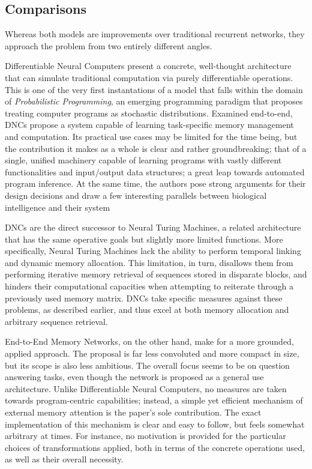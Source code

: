 \documentclass[]{article}
\begin{document}
\subsection{Comparisons}
Whereas both models are improvements over traditional recurrent networks, they approach the problem from two entirely different angles. 

Differentiable Neural Computers present a concrete, well-thought architecture that can simulate traditional computation via purely differentiable operations. This is one of the very first instantations of a model that falls within the domain of \textit{Probabilistic Programming}\cite{Meijer}, an emerging programming paradigm that proposes treating computer programs as stochastic distributions. Examined end-to-end, DNCs propose a system capable of learning task-specific memory management and computation. Its practical use cases may be limited for the time being, but the contribution it makes as a whole is clear and rather groundbreaking; that of a single, unified machinery capable of learning programs with vastly different functionalities and input/output data structures; a great leap towards automated program inference. At the same time, the authors pose strong arguments for their design decisions and draw a few interesting parallels between biological intelligence and their system

DNCs are the direct successor to Neural Turing Machines\cite{DBLP:journals/corr/GravesWD14}, a related architecture that has the same operative goals but slightly more limited functions. More specifically, Neural Turing Machines lack the ability to perform temporal linking and dynamic memory allocation. This limitation, in turn, disallows them from performing iterative memory retrieval of sequences stored in disparate blocks, and hinders their computational capacities when attempting to reiterate through a previously used memory matrix. DNCs take specific measures against these problems, as described earlier, and thus excel at both memory allocation and arbitrary sequence retrieval.

End-to-End Memory Networks, on the other hand, make for a more grounded, applied approach. The proposal is far less convoluted and more compact in size, but its scope is also less ambitious. The overall focus seems to be on question answering tasks, even though the network is proposed as a general use architecture. Unlike Differentiable Neural Computers, no measures are taken towards program-centric capabilities; instead, a simple yet efficient mechanism of external memory attention is the paper's sole contribution. The exact implementation of this mechanism is clear and easy to follow, but feels somewhat arbitrary at times. For instance, no motivation is provided for the particular choices of transformations applied, both in terms of the concrete operations used, as well as their overall necessity. 
\end{document}
